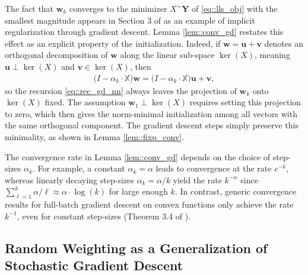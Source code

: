 \documentclass{article}
\newcommand*{\bbX}{\mathbb{X}}
\newcommand*{\bfY}{\mathbf{Y}}
\newcommand*{\bfu}{\mathbf{u}}
\newcommand*{\bfv}{\mathbf{v}}
\newcommand*{\bfw}{\mathbf{w}}
\newcommand*{\inv}{^{-1}}
\newcommand*{\pinv}{^{+}}
\begin{document}
The fact that $\bfw_k$ converges to the minimizer $X\pinv \bfY$ of
\eqref{eq::lls_obj} with the smallest magnitude appears in Section 3 of
\cite{bartlett_montanari_et_al_2021} as an example of implicit regularization
through gradient descent. Lemma \ref{lem::conv_gd} restates this effect as an
explicit property of the initialization. Indeed, if $\bfw = \bfu + \bfv$ denotes
an orthogonal decomposition of $\bfw$ along the linear sub-space $\ker(X)$,
meaning $\bfu \perp \ker(X)$ and $\bfv \in \ker(X)$, then \begin{align*}
  \big(I - \alpha_k \cdot \bbX\big) \bfw = \big(I - \alpha_k \cdot \bbX\big)
  \bfu + \bfv,
\end{align*} so the recursion \eqref{eq::rec_gd_nn} always leaves the projection
of $\bfw_k$ onto $\ker(X)$ fixed. The assumption $\bfw_1 \perp \ker(X)$ requires
setting this projection to zero, which then gives the norm-minimal
initialization among all vectors with the same orthogonal component. The
gradient descent steps simply preserve this minimality, as shown in Lemma
\ref{lem::fixp_conv}.

The convergence rate in Lemma \ref{lem::conv_gd} depends on the choice of
step-sizes $\alpha_k$. For example, a constant $\alpha_k = \alpha$ leads to
convergence at the rate $e^{-k}$, whereas linearly decaying step-sizes $\alpha_k
= \alpha / k$ yield the rate $k^{- \alpha}$ since $\sum_{\ell = 1}^k \alpha /
\ell \approx \alpha \cdot \log(k)$ for large enough $k$. In contrast, generic
convergence results for full-batch gradient descent on convex functions only
achieve the rate $k\inv$, even for constant step-sizes (Theorem 3.4 of
\cite{garrigos_gower_2024}).

\subsection{Random Weighting as a Generalization of Stochastic Gradient
Descent}
\end{document}
